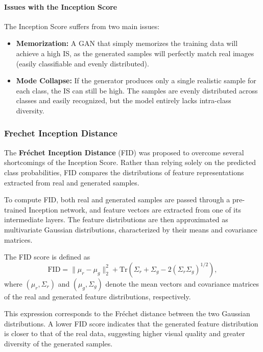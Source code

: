 \paragraph{Issues with the Inception Score}
The Inception Score suffers from two main issues:
\begin{itemize}
    \item \textbf{Memorization:} A GAN that simply memorizes the training data will achieve a high IS, as the generated samples will perfectly match real images (easily classifiable and evenly distributed).
    \item \textbf{Mode Collapse:} If the generator produces only a single realistic sample for each class, the IS can still be high. The samples are evenly distributed across classes and easily recognized, but the model entirely lacks intra-class diversity.
\end{itemize}

\subsubsection{Frechet Inception Distance}

The \textbf{Fréchet Inception Distance} (FID) was proposed to overcome several shortcomings of the Inception Score. 
Rather than relying solely on the predicted class probabilities, FID compares the distributions of feature representations extracted from real and generated samples.

To compute FID, both real and generated samples are passed through a pre-trained Inception network, and feature vectors are extracted from one of its intermediate layers. 
The feature distributions are then approximated as multivariate Gaussian distributions, characterized by their means and covariance matrices.

The FID score is defined as
\begin{equation}
    \mathrm{FID} =
    \|\mu_r-\mu_g\|_2^2 +
    \mathrm{Tr}\!\left(
        \Sigma_r+\Sigma_g
        -2(\Sigma_r\Sigma_g)^{1/2}
    \right),
\end{equation}
where $(\mu_r,\Sigma_r)$ and $(\mu_g,\Sigma_g)$ denote the mean vectors and covariance matrices of the real and generated feature distributions, respectively.

This expression corresponds to the Fréchet distance between the two Gaussian distributions.
A lower FID score indicates that the generated feature distribution is closer to that of the real data, suggesting higher visual quality and greater diversity of the generated samples.

